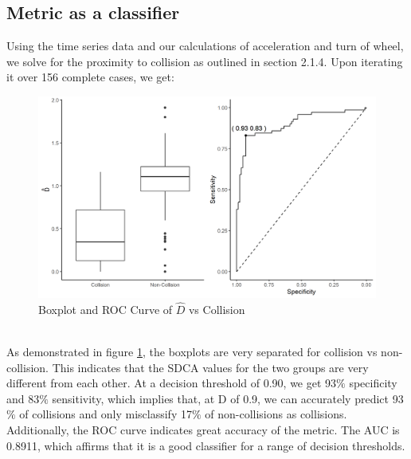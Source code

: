 \documentclass{article}
\begin{document}
\subsection{Metric as a classifier}
Using the time series data and our calculations of acceleration and turn of wheel, we solve for the proximity to collision as outlined in section 2.1.4. Upon iterating it over 156 complete cases, we get:\\
\begin{figure}[h!]
\includegraphics[width = 12cm, height = 7 cm]{fig2.png}
\caption{Boxplot and ROC Curve of $\hat{D} $ vs Collision}
\label{figure 2}
\end{figure}\\
As demonstrated in figure \ref{figure 2}, the boxplots are very separated for collision vs non-collision. This indicates that the SDCA values for the two groups are very different from each other. At a decision threshold of 0.90, we get 93$\%$ specificity and 83$\%$ sensitivity, which implies that, at D of 0.9, we can accurately predict 93$\%$ of collisions and only misclassify 17$\%$ of non-collisions as collisions. Additionally, the ROC curve indicates great accuracy of the metric. The AUC is 0.8911, which affirms that it is a good classifier for a range of decision thresholds.
\end{document}
